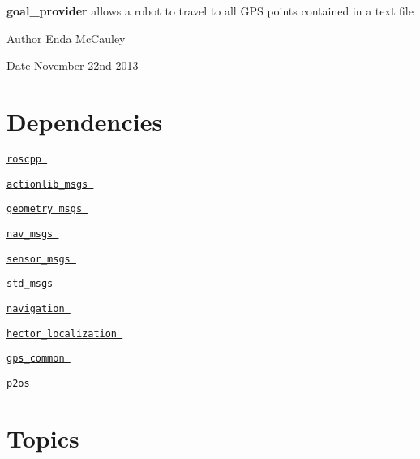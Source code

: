 {\bfseries goal\-\_\-provider} allows a robot to travel to all \-G\-P\-S points contained in a text file \par
 \par
 \begin{DoxyAuthor}{\-Author}
\-Enda \-Mc\-Cauley 
\end{DoxyAuthor}
\begin{DoxyDate}{\-Date}
\-November 22nd 2013
\end{DoxyDate}
\hypertarget{index_dependencies}{}\section{\-Dependencies}\label{index_dependencies}

\begin{DoxyItemize}
\item {\ttfamily } \href{http://wiki.ros.org/roscpp}{\tt roscpp }
\item {\ttfamily } \href{http://wiki.ros.org/actionlib_msgs}{\tt actionlib\-\_\-msgs }
\item {\ttfamily } \href{http://wiki.ros.org/geometry_msgs}{\tt geometry\-\_\-msgs }
\item {\ttfamily } \href{http://wiki.ros.org/nav_msgs}{\tt nav\-\_\-msgs }
\item {\ttfamily } \href{http://wiki.ros.org/sensor_msgs}{\tt sensor\-\_\-msgs }
\item {\ttfamily } \href{http://wiki.ros.org/std_msgs}{\tt std\-\_\-msgs }
\item {\ttfamily } \href{http://http://wiki.ros.org/navigation?distro=hydro}{\tt navigation }
\item {\ttfamily } \href{http://wiki.ros.org/hector_localization}{\tt hector\-\_\-localization }
\item {\ttfamily } \href{http://wiki.ros.org/gps_common}{\tt gps\-\_\-common }
\item {\ttfamily } \href{http://http://wiki.ros.org/p2os}{\tt p2os }
\end{DoxyItemize}\hypertarget{index_topics}{}\section{\-Topics}\label{index_topics}

